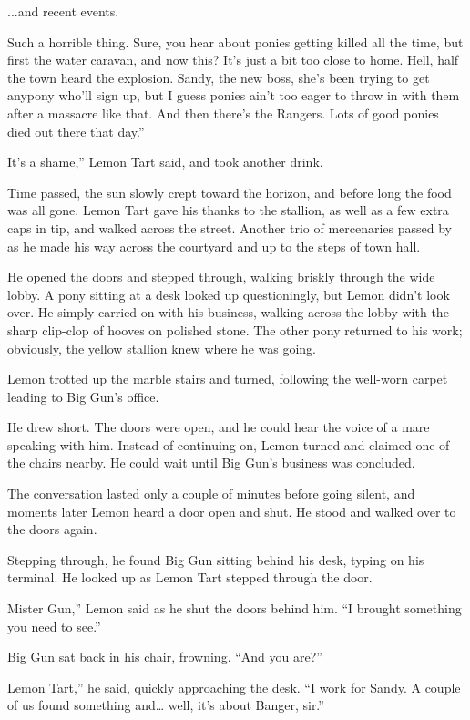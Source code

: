 ...and recent events.

\leavevmode{}Such a horrible thing. Sure, you hear about ponies getting killed all the time, but first the water caravan, and now this? It’s just a bit too close to home. Hell, half the town heard the explosion. Sandy, the new boss, she’s been trying to get anypony who’ll sign up, but I guess ponies ain’t too eager to throw in with them after a massacre like that. And then there’s the Rangers. Lots of good ponies died out there that day.”

\leavevmode{}It’s a shame,” Lemon Tart said, and took another drink.

Time passed, the sun slowly crept toward the horizon, and before long the food was all gone. Lemon Tart gave his thanks to the stallion, as well as a few extra caps in tip, and walked across the street. Another trio of mercenaries passed by as he made his way across the courtyard and up to the steps of town hall.

He opened the doors and stepped through, walking briskly through the wide lobby. A pony sitting at a desk looked up questioningly, but Lemon didn’t look over. He simply carried on with his business, walking across the lobby with the sharp clip-clop of hooves on polished stone. The other pony returned to his work; obviously, the yellow stallion knew where he was going.

Lemon trotted up the marble stairs and turned, following the well-worn carpet leading to Big Gun’s office.

He drew short. The doors were open, and he could hear the voice of a mare speaking with him. Instead of continuing on, Lemon turned and claimed one of the chairs nearby. He could wait until Big Gun’s business was concluded.

The conversation lasted only a couple of minutes before going silent, and moments later Lemon heard a door open and shut. He stood and walked over to the doors again.

Stepping through, he found Big Gun sitting behind his desk, typing on his terminal. He looked up as Lemon Tart stepped through the door.

\leavevmode{}Mister Gun,” Lemon said as he shut the doors behind him. “I brought something you need to see.”

Big Gun sat back in his chair, frowning. “And you are?”

\leavevmode{}Lemon Tart,” he said, quickly approaching the desk. “I work for Sandy. A couple of us found something and… well, it’s about Banger, sir.”

